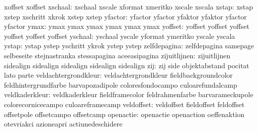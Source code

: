                           xoffset                   xoffset %
                  xschaal: xschaal                   xscale
                           xformat                   xmeritko
                           xscale                    xscala %
                    xstap: xstap                     xstep
                           xschritt                  xkrok
                           xstep                     xstep %
                  yfactor: yfactor                   yfactor
                           yfaktor                   yfaktor
                           yfactor                   yfactor %
                     ymax: ymax                      ymax
                           ymax                      ymax
                           ymax                      ymax %
                  yoffset: yoffset                   yoffset
                           yoffset                   yoffset
                           yoffset                   yoffset %
                  yschaal: yschaal                   yscale
                           yformat                   ymeritko
                           yscale                    yscala %
                    ystap: ystap                     ystep
                           yschritt                  ykrok
                           ystep                     ystep %
             zelfdepagina: zelfdepagina              samepage
                           selbeseite                stejnastranka
                           stessapagina              aceeasipagina
zijuitlijnen: zijuitlijnen sidealign
              sidealign    sidealign
              sidealign    sidealign
                      zij: zij                       side
                           objektabstand             pocitat
                           lato                      parte
     veldachtergrondkleur: veldachtergrondkleur      fieldbackgroundcolor
                           feldhintergrundfarbe      barvapozadipole
                           coloresfondocampo         culoarefundalcamp
           veldkaderkleur: veldkaderkleur            fieldframecolor
                           feldrahmenfarbe           barvarameckupole
                           colorecornicecampo        culoareframecamp
               veldoffset: veldoffset                fieldoffset
                           feldoffset                offsetpole
                           offsetcampo               offsetcamp
                openactie: openactie                 openaction
                           oeffenaktion              otevriakci
                           azioneapri                actiunedeschidere
